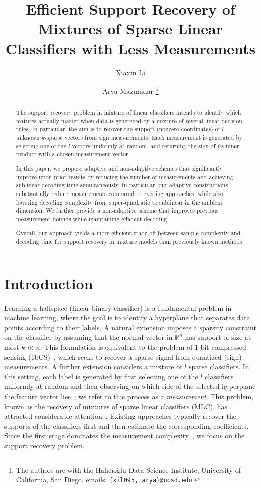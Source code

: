 \documentclass{article}
\title{Efficient Support Recovery of Mixtures of Sparse Linear Classifiers with Less Measurements}
\author{Xiaxin Li \and Arya Mazumdar
\thanks{The authors are with the Hal{\i}c{\i}o\u{g}lu Data Science Institute, University of California, San Diego. emails: \texttt{\{xil095, arya\}@ucsd.edu}.
}
}
\date{}
\begin{document}
\maketitle
\begin{abstract}
The support recovery problem in mixture of linear classifiers intends to identify which features actually matter when data is generated by a mixture of several linear decision rules. In particular, the aim is to recover the support (nonzero coordinates) of $l$ unknown $k$-sparse vectors from sign measurements. Each measurement is generated by selecting one of the $l$ vectors uniformly at random, and returning the sign of its inner product with a chosen measurement vector.

In this paper, we propose adaptive and non-adaptive schemes that significantly improve upon prior results by reducing the number of measurements and achieving sublinear decoding time simultaneously. In particular, our adaptive constructions substantially reduce measurements compared to existing approaches, while also lowering decoding complexity from super-quadratic to sublinear in the ambient dimension. We further provide a non-adaptive scheme that improves previous measurement bounds while maintaining efficient decoding.

Overall, our approach yields a more efficient trade-off between sample complexity and decoding time for support recovery in mixture models than previously known methods.
\end{abstract}

\section{Introduction}\label{sec:intro}
Learning a halfspace (linear binary classifier) is a fundamental problem in machine learning, where the goal is to identify a hyperplane that separates data points according to their labels. A natural extension imposes a sparsity constraint on the classifier by assuming that the normal vector in $\mathbb{R}^n$ has support of size at most $k\ll n$. This formulation is equivalent to the problem of $1$-bit compressed sensing (1bCS)~\cite{boufounos20081,acharya2017improved,matsumoto2023improved,li2025support}, which seeks to recover a sparse signal from quantized (sign) measurements. A further extension considers a mixture of $l$ sparse classifiers. In this setting, each label is generated by first selecting one of the $l$ classifiers uniformly at random and then observing on which side of the selected hyperplane the feature vector lies~\cite{sun2014learning,yin2018learning}; we refer to this process as a \emph{measurement}. This problem, known as the recovery of mixtures of sparse linear classifiers (MLC), has attracted considerable attention~\cite{gandikota2020recovery,pal2021support,polyanskii2021learning,chen2022algorithms,mazumdar2024support}. Existing approaches typically recover the supports of the classifiers first and then estimate the corresponding coefficients. Since the first stage dominates the measurement complexity~\cite{gandikota2020recovery}, we focus on the support recovery problem.
\end{document}
